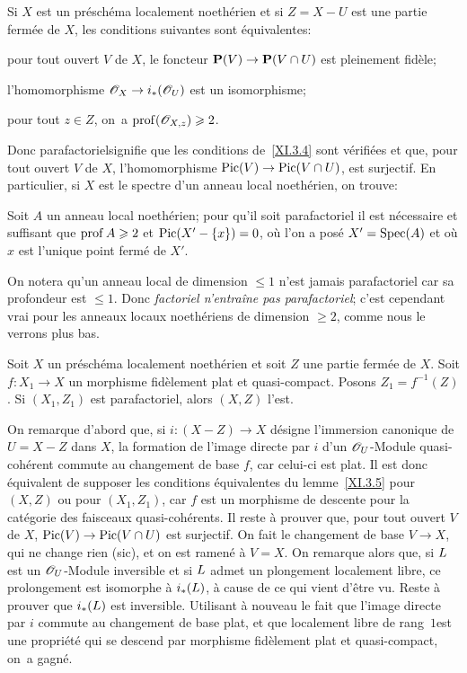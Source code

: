 \begin{lemme} \label{XI.3.4}
Si $X$ est un pr\'esch\'ema localement noeth\'erien et si $Z=X-U$ est une partie ferm\'ee de $X$, les conditions suivantes sont \'equivalentes:
\begin{enumeratei}
\item
pour tout ouvert $V$ de $X$, le foncteur $\PP(V)\to \PP(V\cap U)$ est pleinement fid\`ele;
\item
l'homomorphisme $\OX \to i_*(\Oo_U)$ est un isomorphisme;
\item
pour tout $z\in Z$, on~a $\operatorname{prof}({\mathscr O}_{X, z})\geqslant 2$.
\end{enumeratei}
\end{lemme}

Donc \og parafactoriel\fg signifie que les conditions de~\ref{XI.3.4} sont v\'erifi\'ees et que, pour tout ouvert $V$ de $X$, l'homomorphisme $\Pic(V)\to\Pic(V\cap U)$, est surjectif. En particulier, si $X$ est le spectre d'un anneau local noeth\'erien, on trouve:

\begin{proposition} \label{XI.3.5}
Soit $A$ un anneau local noeth\'erien; pour qu'il soit parafactoriel il est n\'ecessaire et suffisant que $\operatorname{prof} A\geqslant 2$ et $\operatorname{Pic}(X'-\{x\})=0$, o\`u l'on a pos\'e $X'=\operatorname{Spec}(A)$ et o\`u $x$ est l'unique point ferm\'e de $X'$.
\end{proposition}

On notera qu'un anneau local de dimension $\leq 1$ n'est jamais parafactoriel car sa profondeur est $\leq 1$. Donc \emph{factoriel n'entraîne pas parafactoriel}; c'est cependant vrai pour les anneaux locaux noeth\'eriens de dimension $\geq 2$, comme nous le verrons plus bas.

\begin{lemme} \label{XI.3.6} Soit $X$ un pr\'esch\'ema localement noeth\'erien et soit $Z$ une partie ferm\'ee de $X$. Soit $f\colon X_1\to X$ un morphisme fid\`element plat et quasi-compact. Posons $Z_1=f^{-1}(Z)$. Si $(X_1, Z_1)$ est parafactoriel, alors $(X, Z)$ l'est.
\end{lemme}

On remarque d'abord que, si $i\colon(X-Z)\to X$ d\'esigne l'immersion canonique de $U=X-Z$ dans $X$, la formation de l'image directe par $i$ d'un ${\mathscr O}_U$-Module quasi-coh\'erent commute au changement de base $f$, car celui-ci est plat. Il est donc \'equivalent de supposer les conditions \'equivalentes du lemme~\ref{XI.3.5} pour $(X, Z)$ ou pour $(X_1, Z_1)$, car $f$ est un morphisme de descente pour la cat\'egorie des faisceaux quasi-coh\'erents. Il reste \`a prouver que, pour tout ouvert $V$ de $X$, $\Pic(V)\to\Pic(V\cap U)$ est surjectif. On fait le changement de base $V\to X$, qui ne change rien (sic), et on est ramen\'e \`a $V=X$. On remarque alors que, si ${L}$ est un ${\mathscr O}_U$-Module inversible et si ${L}$ admet un plongement localement libre, ce prolongement est isomorphe \`a $i_*({L})$, \`a cause de ce qui vient d'\^etre vu. Reste \`a prouver que $i_*({L})$ est inversible. Utilisant \`a nouveau le fait que l'image directe par $i$ commute au changement de base plat, et que \og localement libre de rang~$1$\fg est une propri\'et\'e qui se descend par morphisme fid\`element plat et quasi-compact, on~a gagn\'e.


